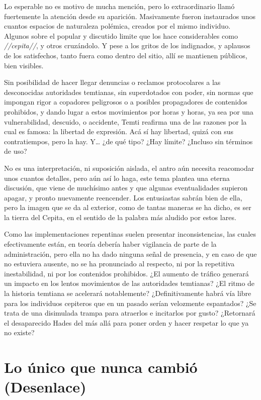\documentclass[
  spanish,
]{book}
\begin{document}
Lo esperable no es motivo de mucha mención, pero lo extraordinario llamó fuertemente la atención desde su aparición. Masivamente fueron instaurados unos cuantos espacios de naturaleza polémica, creados por el mismo individuo. Algunos sobre el popular y discutido limite que los hace considerables como \emph{//cepita//}, y otros cruzándolo. Y pese a los gritos de los indignados, y aplausos de los satisfechos, tanto fuera como dentro del sitio, allí se mantienen públicos, bien visibles.

Sin posibilidad de hacer llegar denuncias o reclamos protocolares a las desconocidas autoridades temtianas, sin superdotados con poder, sin normas que impongan rigor a copadores peligrosos o a posibles propagadores de contenidos prohibidos, y dando lugar a estos movimientos por horas y horas, ya sea por una vulnerabilidad, descuido, o accidente, Temti reafirma una de las razones por la cual es famosa: la libertad de expresión. Acá sí hay libertad, quizá con sus contratiempos, pero la hay. Y\ldots{} ¿de qué tipo? ¿Hay límite? ¿Incluso sin términos de uso?

No es una interpretación, ni suposición aislada, el antro aún necesita reacomodar unos cuantos detalles, pero aún así lo haga, este tema plantea una eterna discusión, que viene de muchísimo antes y que algunas eventualidades supieron apagar, y pronto nuevamente reencender. Los entusiastas sabrán bien de ella, pero la imagen que se da al exterior, como de tantas maneras se ha dicho, es ser la tierra del Cepita, en el sentido de la palabra más aludido por estos lares.

Como las implementaciones repentinas suelen presentar inconsistencias, las cuales efectivamente están, en teoría debería haber vigilancia de parte de la administración, pero ella no ha dado ninguna señal de presencia, y en caso de que no estuviera ausente, no se ha pronunciado al respecto, ni por la repetitiva inestabilidad, ni por los contenidos prohibidos. ¿El aumento de tráfico generará un impacto en los lentos movimientos de las autoridades temtianas? ¿El ritmo de la historia temtiana se acelerará notablemente? ¿Definitivamente habrá vía libre para los individuos cepiteros que en un pasado serían velozmente espantados? ¿Se trata de una disimulada trampa para atraerlos e incitarlos por gusto? ¿Retornará el desaparecido Hades del más allá para poner orden y hacer respetar lo que ya no existe?

\hypertarget{lo-uxfanico-que-nunca-cambiuxf3-desenlace}{%
\chapter{Lo único que nunca cambió (Desenlace)}\label{lo-uxfanico-que-nunca-cambiuxf3-desenlace}}
\end{document}
